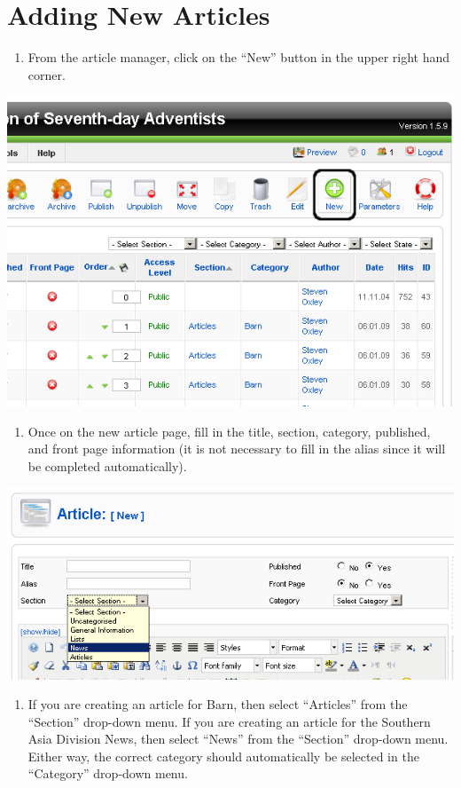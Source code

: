 \documentclass[letterpaper,10pt,english]{manual}
\begin{document}
\hypertarget{index-50}{}\section{Adding New Articles}
\begin{enumerate}
\item {} 
From the article manager, click on the “New” button in the upper right hand corner.

\end{enumerate}

{\hfill\includegraphics{newArticle1.png}\hfill}
\begin{enumerate}
\item {} 
Once on the new article page, fill in the title, section, category, published, and front page information (it is not necessary to fill in the alias since it will be completed automatically).

\end{enumerate}

{\hfill\includegraphics{articleTitleInformation1.png}\hfill}
\begin{enumerate}
\item {} 
If you are creating an article for Barn, then select “Articles” from the “Section” drop-down menu.  If you are creating an article for the Southern Asia Division News, then select “News” from the “Section” drop-down menu.  Either way, the correct category should automatically be selected in the “Category” drop-down menu.

\end{enumerate}
\end{document}

